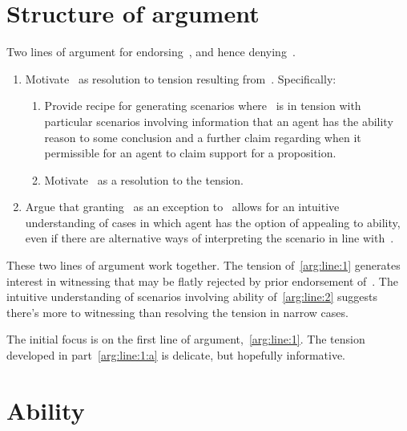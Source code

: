 \section{Structure of argument}
\label{sec:structure-argument}

\begin{note}
  Two lines of argument for endorsing~\EAS{}, and hence denying~\ESU{}.
  \begin{enumerate}[label=(L\arabic*), ref=(L\arabic*)]
  \item\label{arg:line:1} Motivate~\EAS{} as resolution to tension resulting from~\ESU{}.\newline
    Specifically:
    \begin{enumerate}[label=(L1\alph*)]
    \item\label{arg:line:1:a} Provide recipe for generating scenarios where~\ESU{} is in tension with particular scenarios involving information that an agent has the ability reason to some conclusion and a further claim regarding when it permissible for an agent to claim support for a proposition.
    \item\label{arg:line:1:b} Motivate~\EAS{} as a resolution to the tension.
    \end{enumerate}
  \item\label{arg:line:2} Argue that granting~\EAS{} as an exception to~\ESU{} allows for an intuitive understanding of cases in which agent has the option of appealing to ability, even if there are alternative ways of interpreting the scenario in line with~\ESU{}.
  \end{enumerate}
  These two lines of argument work together.
  The tension of~\ref{arg:line:1} generates interest in witnessing that may be flatly rejected by prior endorsement of~\ESU{}.
  The intuitive understanding of scenarios involving ability of~\ref{arg:line:2} suggests there's more to witnessing than resolving the tension in narrow cases.
\end{note}

\begin{note}
  The initial focus is on the first line of argument,~\ref{arg:line:1}.
  The tension developed in part~\ref{arg:line:1:a} is delicate, but hopefully informative.
\end{note}

\section{Ability}
\label{sec:major-argument}
\label{sec:broad-argum-overv}
\label{sec:all-about-ability}

